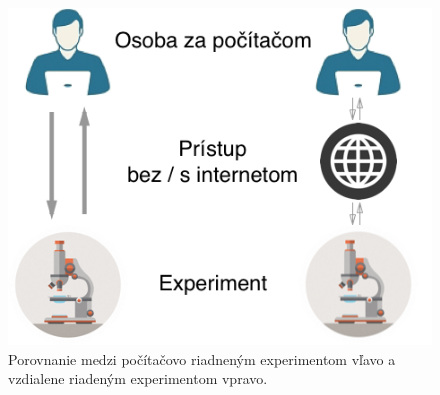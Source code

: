 \begin{figure}[H]
  \centering
  \includegraphics[scale=0.5]{img/VL_vs_real.png}
  \caption{Porovnanie medzi počítačovo riadneným experimentom vľavo a vzdialene riadeným experimentom vpravo.}
  \label{img-real-vs-vl}
\end{figure}

